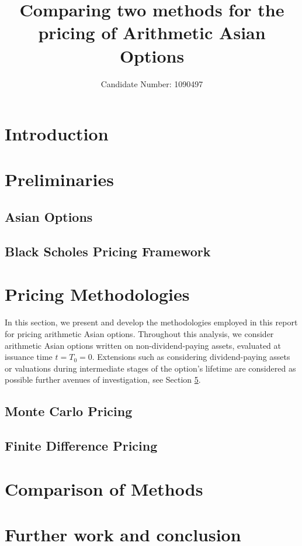 \documentclass[12pt,a4paper]{article}
\title{Comparing two methods for the pricing of Arithmetic Asian Options}
\date{Candidate Number: 1090497}
\begin{document}
\maketitle

\thispagestyle{empty}

\newpage
\setcounter{page}{1}


\section{Introduction}\label{sec:intro}

\section{Preliminaries}\label{sec:preliminaries}
\subsection{Asian Options}

\subsection{Black Scholes Pricing Framework}\label{sec:black_scholes}

\section{Pricing Methodologies}

In this section, we present and develop the methodologies employed in this report for pricing arithmetic Asian options. 
Throughout this analysis, we consider arithmetic Asian options written on non-dividend-paying assets, evaluated at issuance time 
$t=T_0=0$. Extensions such as considering dividend-paying assets or valuations during intermediate stages of the option's lifetime 
are considered as possible further avenues of investigation, see Section \ref{sec:conclusion}.
\subsection{Monte Carlo Pricing}\label{sec:MC_pricing}

\subsection{Finite Difference Pricing}\label{sec:FD_pricing}
\section{Comparison of Methods}\label{sec:comparison}
\section{Further work and conclusion}\label{sec:conclusion}

\printbibliography
\end{document}
